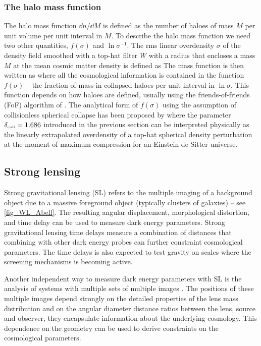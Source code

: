 \subsubsection{The halo mass function}
The halo mass function $\dd n/\dd M$ is defined as the number of haloes of mass $M$ per unit volume per unit interval in $M$. To describe the halo mass function we need two other quantities, $f(\sigma)$ and $\ln\sigma^{-1}$. The rms linear overdensity $\sigma$ of the density field smoothed with a top-hat filter $W$ with a radius that encloses a mass $M$ at the mean cosmic matter density is defined as
The mass function is then written as
where all the cosmological information is contained in the function \(f(\sigma)\) --  the fraction of mass in collapsed haloes per unit interval in $\ln\sigma$. This function depends on how haloes are defined, usually using the friends-of-friends (FoF) algorithm of \textcite{1985ApJ...292..371D}. The analytical form of $f(\sigma)$ using the assumption of collisionless spherical collapse has been proposed by \textcite{1974ApJ...187..425P}
where the parameter \(\delta_\text{\tiny coll}=1.686\) introduced in the previous section can be interpreted physically as the linearly extrapolated overdensity of a top-hat spherical density perturbation at the moment of maximum compression for an Einstein de-Sitter universe.
\subsection{Strong lensing}
Strong gravitational lensing (SL) refers to the multiple imaging of a background object due to a massive foreground object (typically clusters of galaxies) -- see \autoref{fig_WL_Abell}. The resulting angular displacement, morphological distortion, and time delay can be used to measure dark energy parameters. Strong gravitational lensing time delays measure a combination of distances that combining with other dark energy probes can further constraint cosmological parameters. The time delays is also expected to test gravity on scales where the screening mechanisms is becoming active.

Another independent way to measure dark energy parameters with SL is the analysis of systems with multiple sets of multiple images \textcite{SL_in_CLGs}. The positions of these multiple images depend strongly on the detailed properties of the lens mass distribution and on the angular diameter distance ratios between the lens, source and observer, they encapsulate information about the underlying cosmology. This dependence on the geometry can be used to derive constraints on the cosmological parameters.
